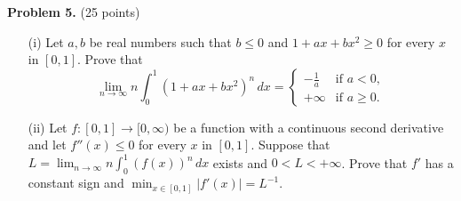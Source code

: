 \documentclass{article}
\begin{document}
\textbf{Problem 5.} (25 points)
\begin{itemize}
    \item[(i)] Let \( a, b \) be real numbers such that \( b \leq 0 \) and \( 1 + ax + bx^2 \geq 0 \) for every \( x \) in \( [0,1] \). Prove that
    \[
    \lim_{n \to \infty} n \int_{0}^{1} (1 + ax + bx^2)^n \, dx =
    \begin{cases}
    -\frac{1}{a} & \text{if } a < 0, \\
    +\infty & \text{if } a \geq 0.
    \end{cases}
    \]

    \item[(ii)] Let \( f : [0,1] \rightarrow [0,\infty) \) be a function with a continuous second derivative and let \( f''(x) \leq 0 \) for every \( x \) in \( [0,1] \). Suppose that \( L = \lim_{n \to \infty} n \int_{0}^{1} (f(x))^n \, dx \) exists and \( 0 < L < +\infty \). Prove that \( f' \) has a constant sign and \( \min_{x \in [0,1]} |f'(x)| = L^{-1} \).
\end{itemize}
\end{document}
